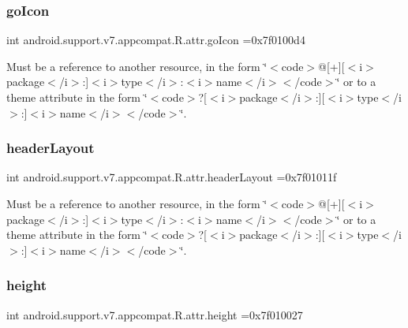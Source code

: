 \subsubsection{\texorpdfstring{go\+Icon}{goIcon}}
{\footnotesize\ttfamily int android.\+support.\+v7.\+appcompat.\+R.\+attr.\+go\+Icon =0x7f0100d4\hspace{0.3cm}{\ttfamily [static]}}

Must be a reference to another resource, in the form \char`\"{}$<$code$>$@\mbox{[}+\mbox{]}\mbox{[}$<$i$>$package$<$/i$>$\+:\mbox{]}$<$i$>$type$<$/i$>$\+:$<$i$>$name$<$/i$>$$<$/code$>$\char`\"{} or to a theme attribute in the form \char`\"{}$<$code$>$?\mbox{[}$<$i$>$package$<$/i$>$\+:\mbox{]}\mbox{[}$<$i$>$type$<$/i$>$\+:\mbox{]}$<$i$>$name$<$/i$>$$<$/code$>$\char`\"{}. \mbox{\label{classandroid_1_1support_1_1v7_1_1appcompat_1_1R_1_1attr_a16960d20392c2e0215098a5eb20f48f2}} 
\subsubsection{\texorpdfstring{header\+Layout}{headerLayout}}
{\footnotesize\ttfamily int android.\+support.\+v7.\+appcompat.\+R.\+attr.\+header\+Layout =0x7f01011f\hspace{0.3cm}{\ttfamily [static]}}

Must be a reference to another resource, in the form \char`\"{}$<$code$>$@\mbox{[}+\mbox{]}\mbox{[}$<$i$>$package$<$/i$>$\+:\mbox{]}$<$i$>$type$<$/i$>$\+:$<$i$>$name$<$/i$>$$<$/code$>$\char`\"{} or to a theme attribute in the form \char`\"{}$<$code$>$?\mbox{[}$<$i$>$package$<$/i$>$\+:\mbox{]}\mbox{[}$<$i$>$type$<$/i$>$\+:\mbox{]}$<$i$>$name$<$/i$>$$<$/code$>$\char`\"{}. \mbox{\label{classandroid_1_1support_1_1v7_1_1appcompat_1_1R_1_1attr_ac0327a7cdb8d8e0b1c7726e150ba0576}} 
\subsubsection{\texorpdfstring{height}{height}}
{\footnotesize\ttfamily int android.\+support.\+v7.\+appcompat.\+R.\+attr.\+height =0x7f010027\hspace{0.3cm}{\ttfamily [static]}}

